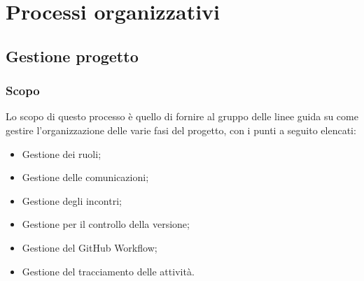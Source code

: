 \section{Processi organizzativi}
	\subsection{Gestione progetto}
	\subsubsection{Scopo}
	Lo scopo di questo processo è quello di fornire al gruppo delle linee guida su come gestire l'organizzazione delle varie fasi del progetto, con i punti a seguito elencati:
	\begin{itemize}
		\item Gestione dei ruoli;
		\item Gestione delle comunicazioni;
		\item Gestione degli incontri;
		\item Gestione per il controllo della versione;
		\item Gestione del GitHub Workflow;
		\item Gestione del tracciamento delle attività.
	\end{itemize}
